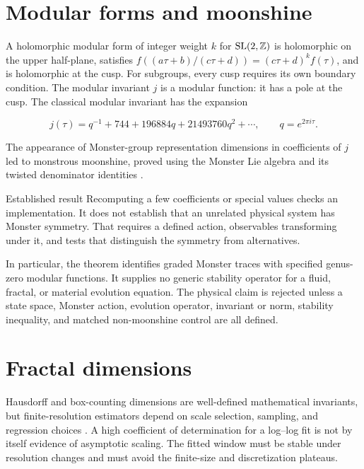 \section{Modular forms and moonshine}

A holomorphic modular form of integer weight $k$ for $\mathrm{SL}(2,\mathbb{Z})$
is holomorphic on the upper half-plane, satisfies
$f((a\tau+b)/(c\tau+d))=(c\tau+d)^k f(\tau)$, and is holomorphic
at the cusp. For subgroups, every cusp requires its own boundary condition.
The modular invariant $j$ is a modular function: it has a pole at the cusp. The classical modular invariant has
the expansion

\begin{equation}
  j(\tau) = q^{-1} + 744 + 196884q + 21493760q^2 + \cdots,
  \qquad q=e^{2\pi i\tau}.
\end{equation}

The appearance of Monster-group representation dimensions in coefficients of
$j$ led to monstrous moonshine, proved using the Monster
Lie algebra and its twisted denominator identities \citep{conway1979monstrous,borcherds1992monstrous}.

\begin{evidence}{Established result}
Recomputing a few coefficients or special values checks an implementation.
It does not establish that an unrelated physical system has Monster symmetry.
That requires a defined action, observables transforming under it, and tests
that distinguish the symmetry from alternatives.
\end{evidence}

In particular, the theorem identifies graded Monster traces with specified
genus-zero modular functions. It supplies no generic stability operator for a
fluid, fractal, or material evolution equation. The physical claim is rejected
unless a state space, Monster action, evolution operator, invariant or norm,
stability inequality, and matched non-moonshine control are all defined.

\section{Fractal dimensions}

Hausdorff and box-counting dimensions are well-defined mathematical invariants,
but finite-resolution estimators depend on scale selection, sampling, and
regression choices \citep{falconer2004fractal}. A high coefficient of
determination for a log--log fit is not by itself evidence of asymptotic scaling.
The fitted window must be stable under resolution changes and must avoid the
finite-size and discretization plateaus.

